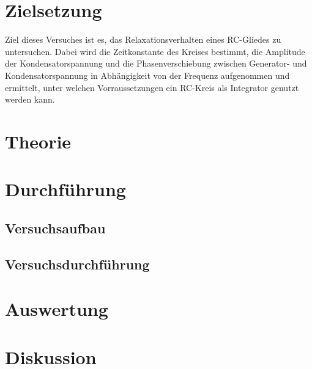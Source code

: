 \maketitle
\tableofcontents
\newpage

\section{Zielsetzung}
Ziel dieses Versuches ist es, das Relaxationsverhalten eines RC-Gliedes zu
untersuchen. Dabei wird die Zeitkonstante des Kreises bestimmt, die Amplitude
der Kondensatorspannung und die Phasenverschiebung zwischen Generator- und Kondensatorspannung
in Abhängigkeit von der Frequenz aufgenommen und ermittelt, unter welchen Vorraussetzungen
ein RC-Kreis als Integrator genutzt werden kann.
\section{Theorie}

\section{Durchführung}

\subsection{Versuchsaufbau}

\subsection{Versuchsdurchführung}

\section{Auswertung}

\section{Diskussion}
\newpage
\nocite{*}
\printbibliography
